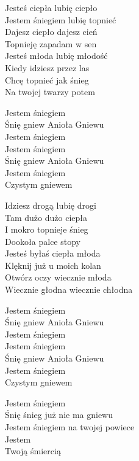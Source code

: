 \begin{text}
    Jesteś ciepła lubię ciepło\\
    Jestem śniegiem lubię topnieć\\
    Dajesz ciepło dajesz cień\\
    Topnieję zapadam w sen\\
    Jesteś młoda lubię młodość\\
    Kiedy idziesz przez las\\
    Chcę topnieć jak śnieg\\
    Na twojej twarzy potem

    Jestem śniegiem\\
    Śnię gniew Anioła Gniewu\\
    Jestem śniegiem\\
    Jestem śniegiem\\
    Śnię gniew Anioła Gniewu\\
    Jestem śniegiem\\
    Czystym gniewem

    Idziesz drogą lubię drogi\\
    Tam dużo dużo ciepła\\
    I mokro topnieje śnieg\\
    Dookoła palce stopy\\
    Jesteś byłaś ciepła młoda\\
    Klęknij już u moich kolan\\
    Otwórz oczy wiecznie młoda\\
    Wiecznie głodna wiecznie chłodna

    Jestem śniegiem\\
    Śnię gniew Anioła Gniewu\\
    Jestem śniegiem\\
    Jestem śniegiem\\
    Śnię gniew Anioła Gniewu\\
    Jestem śniegiem\\
    Czystym gniewem

    Jestem śniegiem\\
    Śnię śnieg już nie ma gniewu\\
    Jestem śniegiem na twojej powiece\\
    Jestem\\
    Twoją śmiercią
\end{text}
\begin{chord}

\end{chord}